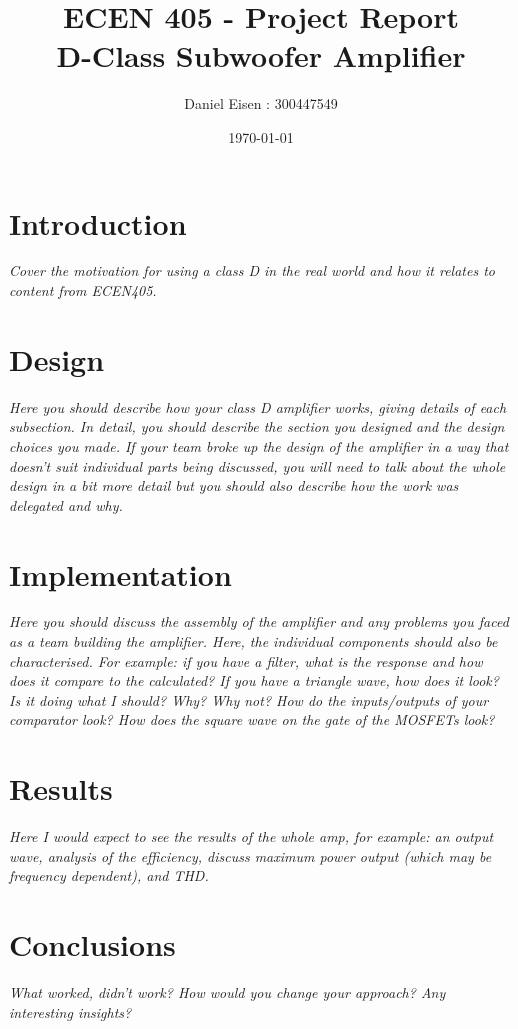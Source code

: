 \documentclass[11pt]{article}
\title{ECEN 405 - Project Report \\ D-Class Subwoofer Amplifier}
\author{Daniel Eisen : 300447549}
\date{\today}
\begin{document}
\maketitle

\section{Introduction}
 
\textit{Cover the motivation for using a class D in the real world and how it relates to content from ECEN405.}
 
\section{Design}
 
\textit{Here you should describe how your class D amplifier works, giving details of each subsection.
In detail, you should describe the section you designed and the design choices you made. If your team broke up the design of the amplifier in a way that doesn’t suit individual parts being discussed, you will need to talk about the whole design in a bit more detail but you should also describe how the work was delegated and why.}
 
\section{Implementation}
 
\textit{Here you should discuss the assembly of the amplifier and any problems you faced as a team building the amplifier.
Here, the individual components should also be characterised. For example: if you have a filter, what is the response and how does it compare to the calculated? If you have a triangle wave, how does it look? Is it doing what I should? Why? Why not? How do the inputs/outputs of your comparator look? How does the square wave on the gate of the MOSFETs look?}
 
\section{Results}
 
\textit{Here I would expect to see the results of the whole amp, for example: an output wave, analysis of the efficiency, discuss maximum power output (which may be frequency dependent), and THD.} 
 
\section{Conclusions}
 
\textit{What worked, didn’t work? How would you change your approach? Any interesting insights?}
 
\end{document}
